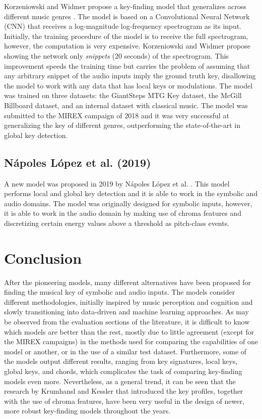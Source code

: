 Korzeniowski and Widmer propose a key-finding model that generalizes across different music genres \cite{korzeniowski2018genreagnostic}. The model is based on a Convolutional Neural Network (CNN) that receives a log-magnitude log-frequency spectrogram as its input. Initially, the training procedure of the model is to receive the full spectrogram, however, the computation is very expensive. Korzeniowski and Widmer propose showing the network only \emph{snippets} (20 seconds) of the spectrogram. This improvement speeds the training time but carries the problem of assuming that any arbitrary snippet of the audio inputs imply the ground truth key, disallowing the model to work with any data that has local keys or modulations. The model was trained on three datasets: the GiantSteps MTG Key dataset, the McGill Billboard dataset, and an internal dataset with classical music. The model was submitted to the MIREX campaign of 2018 and it was very successful at generalizing the key of different genres, outperforming the state-of-the-art in global key detection.


\subsection{N\'apoles L\'opez et al. (2019)}
A new model was proposed in 2019 by N\'apoles L\'opez et al. \cite{napoleslopez2019keyfinding}. This model performs local and global key detection and it is able to work in the symbolic and audio domains. The model was originally designed for symbolic inputs, however, it is able to work in the audio domain by making use of chroma features \cite{mauch2010approximate} and discretizing certain energy values above a threshold as pitch-class events.

\section{Conclusion}
After the pioneering models, many different alternatives have been proposed for finding the musical key of symbolic and audio inputs. The models consider different methodologies, initially inspired by music perception and cognition and slowly transitioning into data-driven and machine learning approaches. As may be observed from the evaluation sections of the literature, it is difficult to know which models are better than the rest, mostly due to little agreement (except for the MIREX campaigns) in the methods used for comparing the capabilities of one model or another, or in the use of a similar test dataset. Furthermore, some of the models output different results, ranging from key signatures, local keys, global keys, and chords, which complicates the task of comparing key-finding models even more. Nevertheless, as a general trend, it can be seen that the research by Krumhansl and Kessler that introduced the key profiles, together with the use of chroma features, have been very useful in the design of newer, more robust key-finding models throughout the years. 

